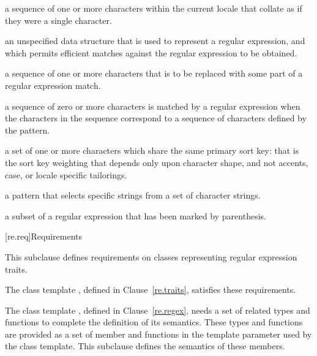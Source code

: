 %
%
a sequence of one or more characters within the
current locale that collate as if they were a single character.

%
an unspecified data structure that is used to
represent a regular expression, and which permits efficient matches
against the regular expression to be obtained.

%
a sequence of one or more characters that is to be
replaced with some part of a regular expression match.

%
%
a sequence of zero or more characters is matched by
a regular expression when the characters in the sequence
correspond to a sequence of characters defined by the pattern.

%
%
a set of one or more characters which
share the same primary sort key: that is the sort key weighting that
depends only upon character shape, and not accents, case, or
locale specific tailorings.

a pattern that selects specific strings
from a set of character strings.

%
a subset of a regular expression that has
been marked by parenthesis.

[re.req]{Requirements}

\pnum
This subclause defines requirements on classes representing regular
expression traits.  \begin{note} The class template
, defined in Clause~\ref{re.traits},
satisfies these requirements.  \end{note}

\pnum
The class template , defined in
Clause~\ref{re.regex}, needs a set of related types and
functions to complete the definition of its semantics. These types
and functions are provided as a set of member  and functions
in the template parameter  used by the  class
template. This subclause defines the semantics of these
members.


